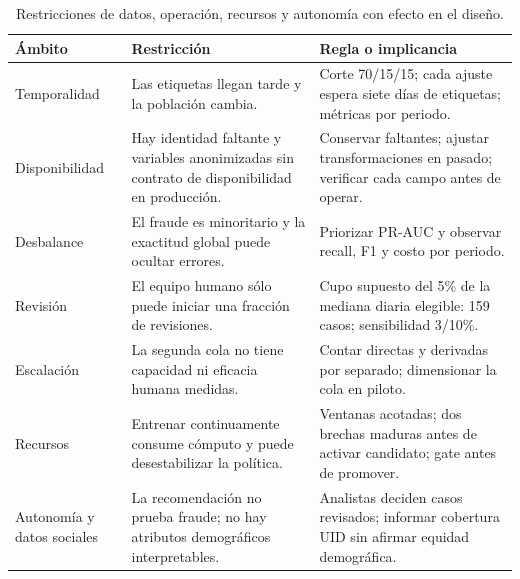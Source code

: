 \documentclass[11pt,letterpaper]{article}
\begin{document}
\begin{table}[H]\centering\small
\begin{tabularx}{\linewidth}{@{}p{24mm}X X@{}}\toprule
Ámbito & Restricción & Regla o implicancia\\\midrule
Temporalidad & Las etiquetas llegan tarde y la población cambia. & Corte 70/15/15; cada ajuste espera siete días de etiquetas; métricas por periodo.\\
Disponibilidad & Hay identidad faltante y variables anonimizadas sin contrato de disponibilidad en producción. & Conservar faltantes; ajustar transformaciones en pasado; verificar cada campo antes de operar.\\
Desbalance & El fraude es minoritario y la exactitud global puede ocultar errores. & Priorizar PR-AUC y observar recall, F1 y costo por periodo.\\
Revisión & El equipo humano sólo puede iniciar una fracción de revisiones. & Cupo supuesto del 5\% de la mediana diaria elegible: 159 casos; sensibilidad 3/10\%.\\
Escalación & La segunda cola no tiene capacidad ni eficacia humana medidas. & Contar directas y derivadas por separado; dimensionar la cola en piloto.\\
Recursos & Entrenar continuamente consume cómputo y puede desestabilizar la política. & Ventanas acotadas; dos brechas maduras antes de activar candidato; gate antes de promover.\\
Autonomía y datos sociales & La recomendación no prueba fraude; no hay atributos demográficos interpretables. & Analistas deciden casos revisados; informar cobertura UID sin afirmar equidad demográfica.\\\bottomrule
\end{tabularx}
\caption{Restricciones de datos, operación, recursos y autonomía con efecto en el diseño.}
\end{table}
\end{document}
